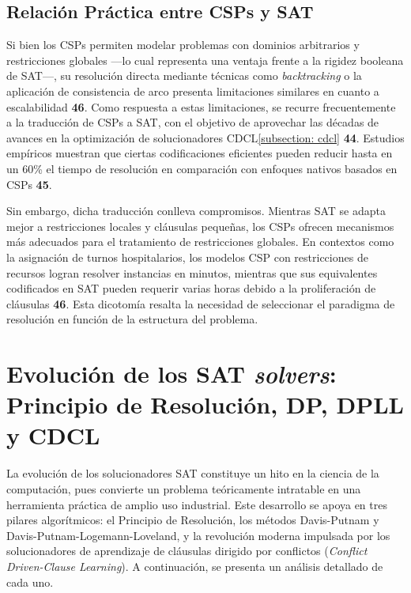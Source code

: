 \subsection{Relación Práctica entre CSPs y SAT}
\label{subsec:csp-sat-relacion}

Si bien los CSPs permiten modelar problemas con dominios arbitrarios y restricciones globales —lo cual representa una ventaja frente a la rigidez booleana de SAT—, su resolución directa mediante técnicas como \textit{backtracking} o la aplicación de consistencia de arco presenta limitaciones similares en cuanto a escalabilidad \textbf{46}. Como respuesta a estas limitaciones, se recurre frecuentemente a la traducción de CSPs a SAT, con el objetivo de aprovechar las décadas de avances en la optimización de solucionadores CDCL\ref{subsection: cdcl} \textbf{44}. Estudios empíricos muestran que ciertas codificaciones eficientes pueden reducir hasta en un 60\% el tiempo de resolución en comparación con enfoques nativos basados en CSPs \textbf{45}.

Sin embargo, dicha traducción conlleva compromisos. Mientras SAT se adapta mejor a restricciones locales y cláusulas pequeñas, los CSPs ofrecen mecanismos más adecuados para el tratamiento de restricciones globales. En contextos como la asignación de turnos hospitalarios, los modelos CSP con restricciones de recursos logran resolver instancias en minutos, mientras que sus equivalentes codificados en SAT pueden requerir varias horas debido a la proliferación de cláusulas \textbf{46}. Esta dicotomía resalta la necesidad de seleccionar el paradigma de resolución en función de la estructura del problema.



\section{Evolución de los SAT \textit{solvers}: Principio de Resolución, DP, DPLL y CDCL}
\label{sec:evolucion-sat-solvers}
La evoluci\'on de los solucionadores SAT constituye un hito en la ciencia de la computaci\'on, pues convierte un problema te\'oricamente intratable en una herramienta pr\'actica de amplio uso industrial. Este desarrollo se apoya en tres pilares algor\'itmicos: el Principio de Resoluci\'on, los m\'etodos Davis-Putnam y Davis-Putnam-Logemann-Loveland, y la revoluci\'on moderna impulsada por los solucionadores de aprendizaje de cl\'ausulas dirigido por conflictos (\textit{Conflict Driven-Clause Learning}). A continuaci\'on, se presenta un an\'alisis detallado de cada uno.

